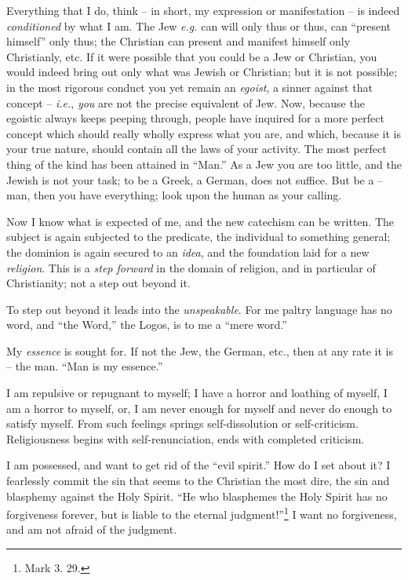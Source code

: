 Everything that I do, think -- in short, my expression or manifestation -- is 
indeed \textit{conditioned} by what I am. The Jew \textit{e.g.} can will only 
thus or thus, can ``present himself'' only thus; the Christian can present 
and manifest himself only Christianly, etc. If it were possible that you could 
be a Jew or Christian, you would indeed bring out only what was Jewish or 
Christian; but it is not possible; in the most rigorous conduct you yet remain 
an \textit{egoist}, a sinner against that concept -- \textit{i.e.}, 
\textit{you} are not the precise equivalent of Jew. Now, because the egoistic 
always keeps peeping through, people have inquired for a more perfect concept 
which should really wholly express what you are, and which, because it is your 
true nature, should contain all the laws of your activity. The most perfect 
thing of the kind has been attained in ``Man.'' As a Jew you are too little, 
and the Jewish is not your task; to be a Greek, a German, does not suffice. 
But be a -- man, then you have everything; look upon the human as your 
calling.

Now I know what is expected of me, and the new catechism can be written. The 
subject is again subjected to the predicate, the individual to something 
general; the dominion is again secured to an \textit{idea}, and the foundation 
laid for a new \textit{religion}. This is a \textit{step forward} in the 
domain of religion, and in particular of Christianity; not a step out beyond 
it.

To step out beyond it leads into the \textit{unspeakable}. For me paltry 
language has no word, and ``the Word,'' the Logos, is to me a ``mere 
word.''

My \textit{essence} is sought for. If not the Jew, the German, etc., then at 
any rate it is -- the man. ``Man is my essence.''

I am repulsive or repugnant to myself; I have a horror and loathing of myself, 
I am a horror to myself, or, I am never enough for myself and never do enough 
to satisfy myself. From such feelings springs self-dissolution or 
self-criticism. Religiousness begins with self-renunciation, ends with 
completed criticism.

I am possessed, and want to get rid of the ``evil spirit.'' How do I set 
about it? I fearlessly commit the sin that seems to the Christian the most 
dire, the sin and blasphemy against the Holy Spirit. ``He who blasphemes the 
Holy Spirit has no forgiveness forever, but is liable to the eternal 
judgment!''\footnote{Mark 3. 29.} I want no forgiveness, and am not afraid of 
the judgment.

